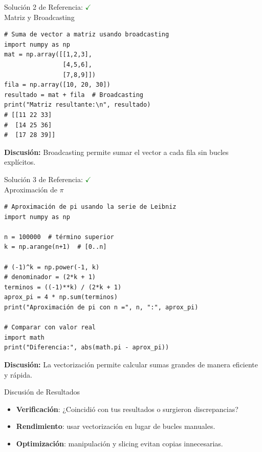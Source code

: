 \documentclass[10pt]{beamer}
\begin{document}
\begin{solutionblock}
\begin{frame}[fragile]{Solución 2 de Referencia: \hfill \textcolor{green}{$\checkmark$} \\ Matriz y Broadcasting}
\begin{verbatim}
# Suma de vector a matriz usando broadcasting
import numpy as np
mat = np.array([[1,2,3],
                [4,5,6],
                [7,8,9]])
fila = np.array([10, 20, 30])
resultado = mat + fila  # Broadcasting
print("Matriz resultante:\n", resultado)
# [[11 22 33]
#  [14 25 36]
#  [17 28 39]]
\end{verbatim}
	\textbf{Discusión:} Broadcasting permite sumar el vector a cada fila sin bucles explícitos.
\end{frame}
\end{solutionblock}

\begin{solutionblock}
\begin{frame}[fragile]{Solución 3 de Referencia: \hfill \textcolor{green}{$\checkmark$} \\ Aproximación de $\pi$}
\begin{verbatim}
# Aproximación de pi usando la serie de Leibniz
import numpy as np

n = 100000  # término superior
k = np.arange(n+1)  # [0..n]

# (-1)^k = np.power(-1, k)
# denominador = (2*k + 1)
terminos = ((-1)**k) / (2*k + 1)
aprox_pi = 4 * np.sum(terminos)
print("Aproximación de pi con n =", n, ":", aprox_pi)

# Comparar con valor real
import math
print("Diferencia:", abs(math.pi - aprox_pi))
\end{verbatim}
	\textbf{Discusión:} La vectorización permite calcular sumas grandes de manera eficiente y rápida.
\end{frame}
\end{solutionblock}

\begin{frame}{Discusión de Resultados}
  \begin{itemize}
    \item \textbf{Verificación}: ¿Coincidió con tus resultados o surgieron discrepancias?
    \item \textbf{Rendimiento}: usar vectorización en lugar de bucles manuales.
    \item \textbf{Optimización}: manipulación y slicing evitan copias innecesarias.
  \end{itemize}
\end{frame}
\end{document}
